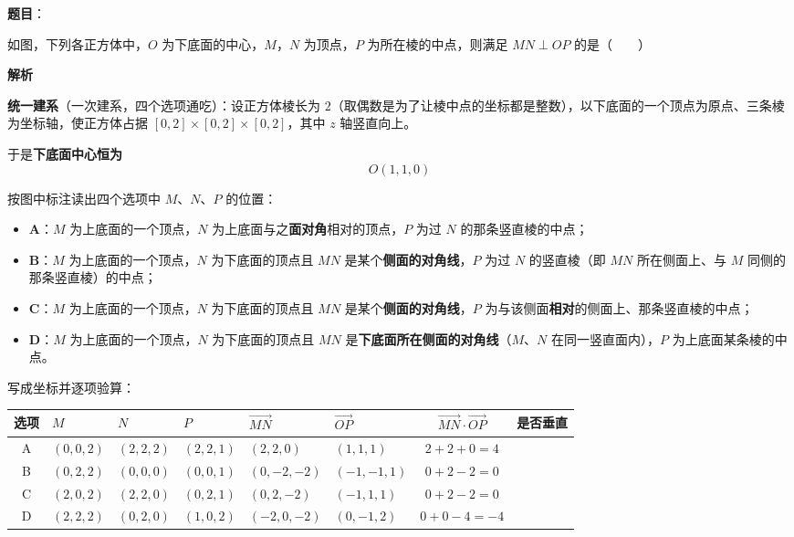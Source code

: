 \begin{answer}

\textbf{题目}：

如图，下列各正方体中，$O$ 为下底面的中心，$M$，$N$ 为顶点，$P$ 为所在棱的中点，则满足 $MN\perp OP$ 的是\mbox{（　　）}
\nopagebreak[4]
\begin{center}\end{center}
\nopagebreak[4]
\textbf{解析}

\textbf{统一建系}（一次建系，四个选项通吃）：设正方体棱长为 $2$（取偶数是为了让棱中点的坐标都是整数），以下底面的一个顶点为原点、三条棱为坐标轴，使正方体占据 $[0,2]\times[0,2]\times[0,2]$，其中 $z$ 轴竖直向上。

于是\textbf{下底面中心恒为}
\nopagebreak[4]
\[O(1,1,0)\]

按图中标注读出四个选项中 $M$、$N$、$P$ 的位置：

\begin{itemize}
\item \textbf{A}：$M$ 为上底面的一个顶点，$N$ 为上底面与之\textbf{面对角}相对的顶点，$P$ 为过 $N$ 的那条竖直棱的中点；
\item \textbf{B}：$M$ 为上底面的一个顶点，$N$ 为下底面的顶点且 $MN$ 是某个\textbf{侧面的对角线}，$P$ 为过 $N$ 的竖直棱（即 $MN$ 所在侧面上、与 $M$ 同侧的那条竖直棱）的中点；
\item \textbf{C}：$M$ 为上底面的一个顶点，$N$ 为下底面的顶点且 $MN$ 是某个\textbf{侧面的对角线}，$P$ 为与该侧面\textbf{相对}的侧面上、那条竖直棱的中点；
\item \textbf{D}：$M$ 为上底面的一个顶点，$N$ 为下底面的顶点且 $MN$ 是\textbf{下底面所在侧面的对角线}（$M$、$N$ 在同一竖直面内），$P$ 为上底面某条棱的中点。
\end{itemize}

写成坐标并逐项验算：

\begin{center}
\begingroup\setlength{\tabcolsep}{4pt}
\begin{tabular}{clllllcc}
\toprule
选项 & $M$ & $N$ & $P$ & $\overrightarrow{MN}$ & $\overrightarrow{OP}$ & $\overrightarrow{MN}\cdot\overrightarrow{OP}$ & 是否垂直 \\
\midrule
A & $(0,0,2)$ & $(2,2,2)$ & $(2,2,1)$ & $(2,2,0)$ & $(1,1,1)$ & $2+2+0=4$ &  \\
B & $(0,2,2)$ & $(0,0,0)$ & $(0,0,1)$ & $(0,-2,-2)$ & $(-1,-1,1)$ & $0+2-2=0$ &  \\
C & $(2,0,2)$ & $(2,2,0)$ & $(0,2,1)$ & $(0,2,-2)$ & $(-1,1,1)$ & $0+2-2=0$ &  \\
D & $(2,2,2)$ & $(0,2,0)$ & $(1,0,2)$ & $(-2,0,-2)$ & $(0,-1,2)$ & $0+0-4=-4$ &  \\
\bottomrule
\end{tabular}
\endgroup
\end{center}


\end{answer}
